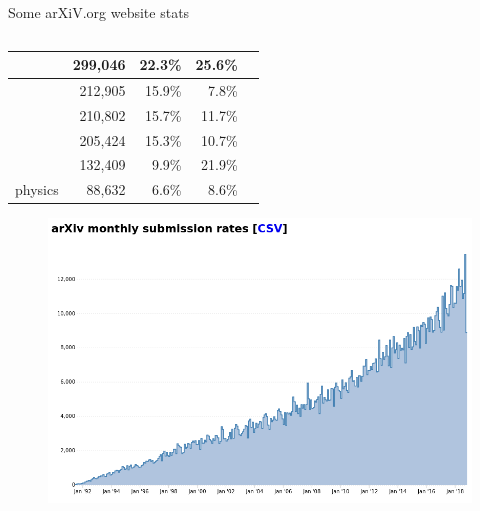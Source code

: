 \documentclass[9pt]{beamer}
\begin{document}
\begin{frame}{Some arXiV.org website stats}
\begin{columns}[T]
\begin{column}{0.5\textwidth}
{\begin{tabular}{|c|r|r|r|r|}
		\color{purple}{math+math-ph} & 299,046 & 22.3\% & 25.6\% \\
		\hline
		\color{blue}{hep} & 212,905 & 15.9\% & 7.8\% \\
		\hline
            \color{green}{cond-mat} & 210,802 & 15.7\% & 11.7\% \\
		\hline
            \color{red}{astro-ph} & 205,424 & 15.3\% & 10.7\% \\
		\hline
		\color{orange}{cs} & 132,409 & 9.9\% & 21.9\% \\
		\hline
		physics & 88,632 & 6.6\% & 8.6\% \\
		\hline
			\end{tabular}}
            \begin{figure}[h]
    \includegraphics[width=\textwidth]{subm_rates.png} 
            \end{figure}
			\end{column}
			\end{columns}
\end{frame}
\end{document}
